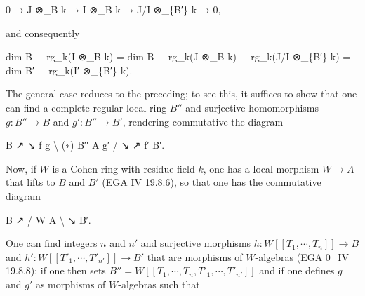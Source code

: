 \documentclass[
  11pt,
  a4paper,
]{book}
\newenvironment{Shaded}{}{}
\newcommand{\NormalTok}[1]{#1}
\begin{document}
\begin{Shaded}
\begin{Highlighting}[]
\NormalTok{0 → J ⊗\_B k → I ⊗\_B k → J/I ⊗\_\{B′\} k → 0,}
\end{Highlighting}
\end{Shaded}

and consequently

\begin{Shaded}
\begin{Highlighting}[]
\NormalTok{dim B − rg\_k(I ⊗\_B k) = dim B − rg\_k(J ⊗\_B k) − rg\_k(J/I ⊗\_\{B′\} k) = dim B′ − rg\_k(I′ ⊗\_\{B′\} k).}
\end{Highlighting}
\end{Shaded}

The general case reduces to the preceding; to see this, it suffices to
show that one can find a complete regular local ring \(B''\) and
surjective homomorphisms \(g : B'' \to B\) and \(g' : B'' \to B'\),
rendering commutative the diagram

\begin{Shaded}
\begin{Highlighting}[]
\NormalTok{                  B}
\NormalTok{                ↗    ↘ f}
\NormalTok{              g        \textbackslash{}}
\NormalTok{(∗)      B′′            A}
\NormalTok{              g′       /}
\NormalTok{                ↘    ↗ f′}
\NormalTok{                  B′.}
\end{Highlighting}
\end{Shaded}

Now, if \(W\) is a Cohen ring with residue field \(k\), one has a local
morphism \(W \to A\) that lifts to \(B\) and \(B'\)
(\href{https://jcreinhold.github.io/ega/iv/32-ch4-19-regular-immersions.html\#198-properties-of-passage-to-projective-limit}{EGA
IV 19.8.6}), so that one has the commutative diagram

\begin{Shaded}
\begin{Highlighting}[]
\NormalTok{                  B}
\NormalTok{                ↗}
\NormalTok{               /}
\NormalTok{          W              A}
\NormalTok{               \textbackslash{}}
\NormalTok{                ↘}
\NormalTok{                  B′.}
\end{Highlighting}
\end{Shaded}

One can find integers \(n\) and \(n'\) and surjective morphisms
\(h : W[[T_{1}, \cdots, T_{n}]] \to B\) and \(h' : W[[T'_{1},
\cdots, T'_{n'}]] \to B'\) that are morphisms of \(W\)-algebras (EGA
0\_IV 19.8.8); if one then sets \(B'' = W[[T_{1},
\cdots, T_{n}, T'_{1}, \cdots, T'_{n'}]]\) and if one defines \(g\) and
\(g'\) as morphisms of \(W\)-algebras such that
\end{document}
